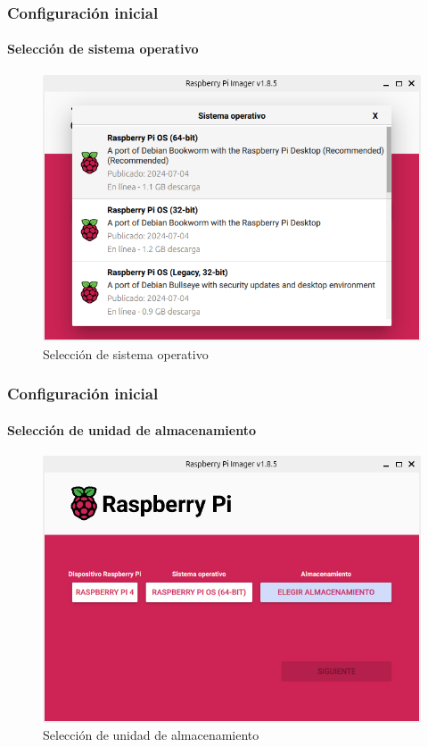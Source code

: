 \documentclass{beamer}
\begin{document}
	\begin{frame}
		\frametitle{Configuración inicial}
		\framesubtitle{Selección de sistema operativo}
		
		\begin{figure}
			\includegraphics[scale=0.35]{imager3.png}
			\caption{Selección de sistema operativo}
		\end{figure}
		
	\end{frame}
	
	\begin{frame}
		\frametitle{Configuración inicial}
		\framesubtitle{Selección de unidad de almacenamiento}
		
		\begin{figure}
			\includegraphics[scale=0.35]{imager4.png}
			\caption{Selección de unidad de almacenamiento}
		\end{figure}
		
	\end{frame}
	
\end{document}
